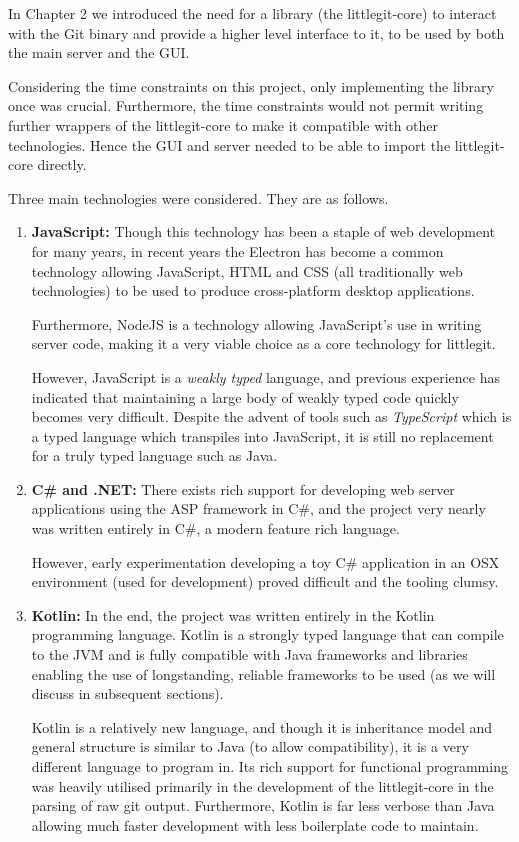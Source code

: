 In Chapter 2 we introduced the need for a library (the littlegit-core) to interact with the Git binary and provide a higher level interface to it, to be used by both the main server and the GUI. 

Considering the time constraints on this project, only implementing the library once was crucial. Furthermore, the time constraints would not permit writing further wrappers of the littlegit-core to make it compatible with other technologies. Hence the GUI and server needed to be able to import the littlegit-core directly. 

Three main technologies were considered. They are as follows.

\begin{enumerate}
\item \textbf{JavaScript:} Though this technology has been a staple of web development for many years, in recent years the Electron \cite{electron} has become a common technology allowing JavaScript, HTML and CSS (all traditionally web technologies) to be used to produce cross-platform desktop applications.

Furthermore, NodeJS \cite{nodejs} is a technology allowing JavaScript's use in writing server code, making it a very viable choice as a core technology for littlegit. 

However, JavaScript is a \emph{weakly typed} language, and previous experience has indicated that maintaining a large body of weakly typed code quickly becomes very difficult. Despite the advent of tools such as \emph{TypeScript} which is a typed language which transpiles into JavaScript, it is still no replacement for a truly typed language such as Java.

\item \textbf{C\# and .NET:} There exists rich support for developing web server applications using the ASP framework in C\#, and the project very nearly was written entirely in C\#, a modern feature rich language.

However, early experimentation developing a toy C\# application in an OSX environment (used for development) proved difficult and the tooling clumsy. 

\item \textbf{Kotlin:} In the end, the project was written entirely in the Kotlin programming language. Kotlin is a strongly typed language that can compile to the JVM and is fully compatible with Java frameworks and libraries enabling the use of longstanding, reliable frameworks to be used (as we will discuss in subsequent sections). 

Kotlin is a relatively new language, and though it is inheritance model and general structure is similar to Java (to allow compatibility), it is a very different language to program in. Its rich support for functional programming was heavily utilised primarily in the development of the littlegit-core in the parsing of raw git output. Furthermore, Kotlin is far less verbose than Java allowing much faster development with less boilerplate code to maintain.


\end{enumerate}


